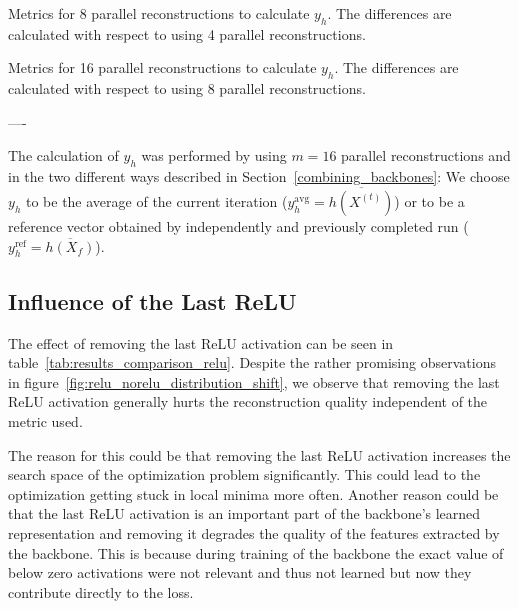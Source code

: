 \documentclass[10pt,twocolumn]{article}
\begin{document}
\begin{table}[ht]
    \centering
        
        \caption{
        Metrics for 8 parallel reconstructions to calculate $y_h$.
        The differences are calculated with respect to using 4 parallel reconstructions.
        }
        \label{tab:results_comparison_04_to_08_recons}
\end{table}

\begin{table}[ht]
    \centering
        
        \caption{
        Metrics for 16 parallel reconstructions to calculate $y_h$.
        The differences are calculated with respect to using 8 parallel reconstructions.
        }
        \label{tab:results_comparison_08_to_16_recons}
\end{table}

\begin{table}[ht]
    \centering
        
        \caption{
        ----
        }
        \label{tab:results_comparison_in_vs_ffhq}
\end{table}

The calculation of $y_h$ was performed by using $m=16$ parallel reconstructions and in the two different ways described in Section~\ref{combining_backbones}:
We choose $y_h$ to be the average of the current iteration ($y_h^\text{avg}=\overline{h(X^{(t)})}$) or to be a reference vector obtained by independently and previously completed run ($y_h^\text{ref}=\overline{h(X_f)}$).
\subsection{Influence of the Last ReLU}
The effect of removing the last ReLU activation can be seen in table~\ref{tab:results_comparison_relu}.
Despite the rather promising observations in figure~\ref{fig:relu_norelu_distribution_shift}, we observe that removing the last ReLU activation generally hurts the reconstruction quality independent of the metric used.

The reason for this could be that removing the last ReLU activation increases the search space of the optimization problem significantly.
This could lead to the optimization getting stuck in local minima more often.
Another reason could be that the last ReLU activation is an important part of the backbone's learned representation and removing it degrades the quality of the features extracted by the backbone.
This is because during training of the backbone the exact value of below zero activations were not relevant and thus not learned but now they contribute directly to the loss.
\end{document}

